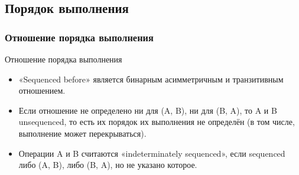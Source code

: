 \documentclass[xetex,mathserif,serif,10pt]{beamer}
\begin{document}
    \subsection{Порядок выполнения}
    \subsubsection{Отношение порядка выполнения}
    \begin{frame}{Отношение порядка выполнения}
        \begin{itemize}
            \item «Sequenced before» является бинарным асимметричным и транзитивным отношением.
            \item Если отношение не определено ни для (A, B), ни для (B, A), то A и B unsequenced,
                то есть их порядок их выполнения не определён (в том числе, выполнение может перекрываться).
            \item Операции A и B считаются «indeterminately sequenced», если sequenced либо (A, B), либо (B, A), но не указано которое.
        \end{itemize}
    \end{frame}
\end{document}
